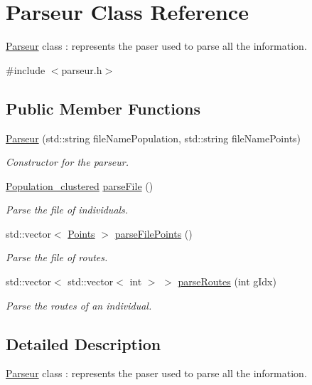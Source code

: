 \hypertarget{class_parseur}{}\section{Parseur Class Reference}
\label{class_parseur}


\hyperlink{class_parseur}{Parseur} class \+: represents the paser used to parse all the information.  




{\ttfamily \#include $<$parseur.\+h$>$}

\subsection*{Public Member Functions}
\begin{DoxyCompactItemize}
\item 
\hyperlink{class_parseur_a32b67fd70e20c4c05f9a7587ffb1c99e}{Parseur} (std\+::string file\+Name\+Population, std\+::string file\+Name\+Points)
\begin{DoxyCompactList}\small\item\em Constructor for the parseur. \end{DoxyCompactList}\item 
\hyperlink{class_population__clustered}{Population\+\_\+clustered} \hyperlink{class_parseur_ab99d3dc36de4089ab266c1e69196fa55}{parse\+File} ()
\begin{DoxyCompactList}\small\item\em Parse the file of individuals. \end{DoxyCompactList}\item 
std\+::vector$<$ \hyperlink{class_points}{Points} $>$ \hyperlink{class_parseur_a67a68af11c904e1e7edd96db89517172}{parse\+File\+Points} ()
\begin{DoxyCompactList}\small\item\em Parse the file of routes. \end{DoxyCompactList}\item 
std\+::vector$<$ std\+::vector$<$ int $>$ $>$ \hyperlink{class_parseur_adc549ca4704a806fd3837091845fc24a}{parse\+Routes} (int g\+Idx)
\begin{DoxyCompactList}\small\item\em Parse the routes of an individual. \end{DoxyCompactList}\end{DoxyCompactItemize}


\subsection{Detailed Description}
\hyperlink{class_parseur}{Parseur} class \+: represents the paser used to parse all the information. 

